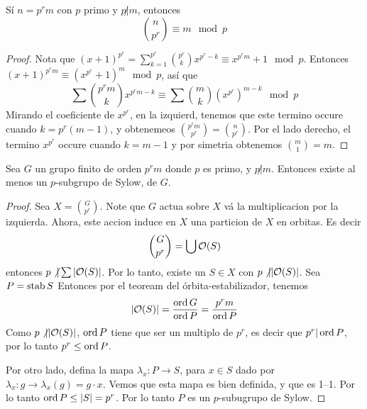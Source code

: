 \begin{lemma}\label{8.32}
    S\'i $n=p^rm$ con  $p$ primo y  $p \not| m$, entonces
    \begin{equation*}
        {n \choose p^r} \equiv m \mod{p}
    \end{equation*}
\end{lemma}
\begin{proof}
    Nota que $(x+1)^{p^r}=\sum_{k=1}^{p^r}{{p^r \choose k}x^{p^r-k}}
    \equiv x^{p^rm}+1 \mod{p}$. Entonces $(x+1)^{p^rm} \equiv (x^{p^r}+1)^m
    \mod{p}$, as\'i que
    \begin{equation*}
        \sum{{p^rm \choose k}x^{p^rm-k}} \equiv \sum{{m \choose
        k}(x^{p^r})^{m-k}} \mod{p}
    \end{equation*}
    Mirando el coeficiente de $x^{p^r}$, en la izquierd, tenemos que este
    termino occure cuando $k=p^r(m-1)$, y obtenemeos ${p^rm \choose p^r}={n
    \choose p^r}$. Por el lado derecho, el termino $x^{p^r}$ occure cuando
    $k=m-1$ y por simetria obtenemos ${m \choose 1}=m$.
\end{proof}

\begin{theorem}\label{8.33}
    Sea $G$ un grupo finito de orden  $p^rm$ donde  $p$ es primo, y  $p \not|
    m$. Entonces existe al menos un  $p$-subgrupo de Sylow, de  $G$.
\end{theorem}
\begin{proof}
    Sea $X={G \choose p^r}$. Note que $G$ actua sobre  $X$ v\'a la
    multiplicacion por la izquierda. Ahora, este accion induce en  $X$ una
    particion de  $X$ en orbitas. Es decir
    \begin{equation*}
        {G \choose p^r}=\bigcup{\mathcal{O}(S)}
    \end{equation*}
    entonces $p \not| \sum{|\mathcal{O}(S)|}$. Por lo tanto, existe un $S \in X$ con $p
    \not| |\mathcal{O}(S)|$. Sea $P=\operatorname{stab}{S}$ Entonces por el teoream del
    \'orbita-estabilizador, tenemos
    \begin{equation*}
        |\mathcal{O}(S)|=\frac{\operatorname{ord}{G}}{\operatorname{ord}{P}}=\frac{p^rm}{\operatorname{ord}{P}}
    \end{equation*}
    Como $p \not| |\mathcal{O}(S)|$, $\operatorname{ord}{P}$ tiene que ser un multiplo de $p^r$, es
    decir que $p^r | \operatorname{ord}{P}$, por lo tanto $p^r \leq \operatorname{ord}{P}$.

    Por otro lado, defina la mapa $\lambda_x:P \xrightarrow{} S$, para $x \in S$
    dado por $\lambda_x:g \xrightarrow{} \lambda_x(g)=g \cdot x$. Vemos que esta
    mapa es bien definida, y que es 1--1. Por lo tanto $\operatorname{ord}{P} \leq |S|=p^r$.
    Por lo tanto $P$ es un  $p$-subugrupo de Sylow.
\end{proof}
